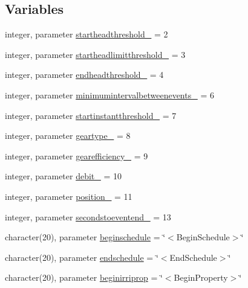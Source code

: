 \subsection*{Variables}
\begin{DoxyCompactItemize}
\item 
integer, parameter \mbox{\hyperlink{namespacemoduleirrigation_a3b553457a1005642e2ac59eb843de92a}{startheadthreshold\+\_\+}} = 2
\item 
integer, parameter \mbox{\hyperlink{namespacemoduleirrigation_a43d8aa216adc2cd9b9db5c2aa1f90348}{startheadlimitthreshold\+\_\+}} = 3
\item 
integer, parameter \mbox{\hyperlink{namespacemoduleirrigation_ab4cd763a1789ba18e00c7dae6547325f}{endheadthreshold\+\_\+}} = 4
\item 
integer, parameter \mbox{\hyperlink{namespacemoduleirrigation_a7c52a4d567422946329e7dffa6698cd7}{minimumintervalbetweenevents\+\_\+}} = 6
\item 
integer, parameter \mbox{\hyperlink{namespacemoduleirrigation_ae5b31d672d8c4384b45e3ae223caf4c5}{startinstantthreshold\+\_\+}} = 7
\item 
integer, parameter \mbox{\hyperlink{namespacemoduleirrigation_a1ad7dafe571fb7b8c766b6d5c9c91731}{geartype\+\_\+}} = 8
\item 
integer, parameter \mbox{\hyperlink{namespacemoduleirrigation_ab50ffa53613e9117da8236fe72ef8e20}{gearefficiency\+\_\+}} = 9
\item 
integer, parameter \mbox{\hyperlink{namespacemoduleirrigation_a469ab4816f9930b188249666036ab2c0}{debit\+\_\+}} = 10
\item 
integer, parameter \mbox{\hyperlink{namespacemoduleirrigation_a4715bb03155d7869bc30822df5a48104}{position\+\_\+}} = 11
\item 
integer, parameter \mbox{\hyperlink{namespacemoduleirrigation_a7554b7e361ce512902bddcb3bc6f8f11}{secondstoeventend\+\_\+}} = 13
\item 
character(20), parameter \mbox{\hyperlink{namespacemoduleirrigation_a308de16d1c9334b19953d80706843c0f}{beginschedule}} = \char`\"{}$<$Begin\+Schedule$>$\char`\"{}
\item 
character(20), parameter \mbox{\hyperlink{namespacemoduleirrigation_a60900c938a0d92ac18e3459bf54ee951}{endschedule}} = \char`\"{}$<$End\+Schedule$>$\char`\"{}
\item 
character(20), parameter \mbox{\hyperlink{namespacemoduleirrigation_a7b9cd689d449001080ee8306937e548b}{beginirriprop}} = \char`\"{}$<$Begin\+Property$>$\char`\"{}

\end{DoxyCompactItemize}
